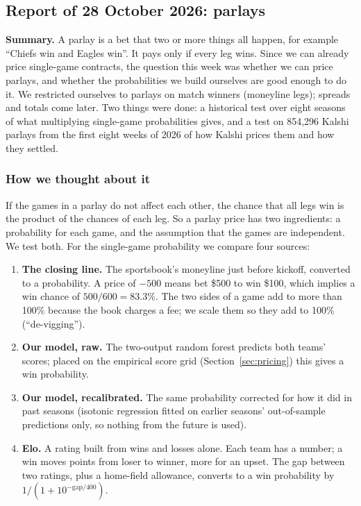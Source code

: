 \subsection{Report of 28 October 2026: parlays}\label{sec:w1028}

\textbf{Summary.} A parlay is a bet that two or more things all happen, for example ``Chiefs win and Eagles win''. It pays only if every leg wins. Since we can already price single-game contracts, the question this week was whether we can price parlays, and whether the probabilities we build ourselves are good enough to do it. We restricted ourselves to parlays on match winners (moneyline legs); spreads and totals come later. Two things were done: a historical test over eight seasons of what multiplying single-game probabilities gives, and a test on 854,296 Kalshi parlays from the first eight weeks of 2026 of how Kalshi prices them and how they settled.

\subsubsection{How we thought about it}

If the games in a parlay do not affect each other, the chance that all legs win is the product of the chances of each leg. So a parlay price has two ingredients: a probability for each game, and the assumption that the games are independent. We test both. For the single-game probability we compare four sources:
\begin{enumerate}[nosep]
\item \textbf{The closing line.} The sportsbook's moneyline just before kickoff, converted to a probability. A price of $-500$ means bet \$500 to win \$100, which implies a win chance of $500/600 = 83.3\%$. The two sides of a game add to more than 100\% because the book charges a fee; we scale them so they add to 100\% (``de-vigging'').
\item \textbf{Our model, raw.} The two-output random forest predicts both teams' scores; placed on the empirical score grid (Section~\ref{sec:pricing}) this gives a win probability.
\item \textbf{Our model, recalibrated.} The same probability corrected for how it did in past seasons (isotonic regression fitted on earlier seasons' out-of-sample predictions only, so nothing from the future is used).
\item \textbf{Elo.} A rating built from wins and losses alone. Each team has a number; a win moves points from loser to winner, more for an upset. The gap between two ratings, plus a home-field allowance, converts to a win probability by $1/(1+10^{-\text{gap}/400})$.
\end{enumerate}

